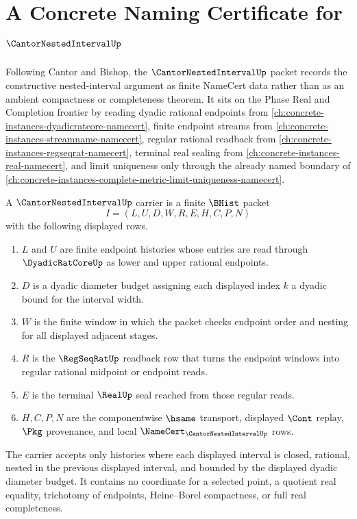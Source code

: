 \chapter{A Concrete Naming Certificate for $\CantorNestedIntervalUp$}
\label{ch:concrete-instances-cantor-nested-interval-namecert}

Following Cantor and Bishop, the $\CantorNestedIntervalUp$ packet records the constructive nested-interval argument as finite NameCert data rather than as an ambient compactness or completeness theorem. It sits on the Phase Real and Completion frontier by reading dyadic rational endpoints from \autoref{ch:concrete-instances-dyadicratcore-namecert}, finite endpoint streams from \autoref{ch:concrete-instances-streamname-namecert}, regular rational readback from \autoref{ch:concrete-instances-regseqrat-namecert}, terminal real sealing from \autoref{ch:concrete-instances-real-namecert}, and limit uniqueness only through the already named boundary of \autoref{ch:concrete-instances-complete-metric-limit-uniqueness-namecert}.

\begin{definition}
\label{def:cantor-nested-interval-carrier}
A $\CantorNestedIntervalUp$ carrier is a finite $\BHist$ packet
$$
I=(L,U,D,W,R,E,H,C,P,N)
$$
with the following displayed rows.
\begin{enumerate}
\item $L$ and $U$ are finite endpoint histories whose entries are read through $\DyadicRatCoreUp$ as lower and upper rational endpoints.
\item $D$ is a dyadic diameter budget assigning each displayed index $k$ a dyadic bound for the interval width.
\item $W$ is the finite window in which the packet checks endpoint order and nesting for all displayed adjacent stages.
\item $R$ is the $\RegSeqRatUp$ readback row that turns the endpoint windows into regular rational midpoint or endpoint reads.
\item $E$ is the terminal $\RealUp$ seal reached from those regular reads.
\item $H,C,P,N$ are the componentwise $\hsame$ transport, displayed $\Cont$ replay, $\Pkg$ provenance, and local $\NameCert_{\CantorNestedIntervalUp}$ rows.
\end{enumerate}
The carrier accepts only histories where each displayed interval is closed, rational, nested in the previous displayed interval, and bounded by the displayed dyadic diameter budget. It contains no coordinate for a selected point, a quotient real equality, trichotomy of endpoints, Heine--Borel compactness, or full real completeness.
\end{definition}

